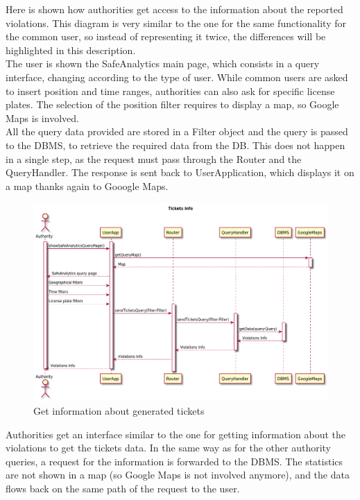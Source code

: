 \documentclass[./main.tex]{subfiles}
\begin{document}
Here is shown how authorities get access to the information about the reported violations. This diagram is very similar to the one for the same functionality for the common user, so instead of representing it twice, the differences will be highlighted in this description.\\
The user is shown the SafeAnalytics main page, which consists in a query interface, changing according to the type of user. While common users are asked to insert position and time ranges, authorities can also ask for specific license plates. The selection of the position filter requires to display a map, so Google Maps is involved.\\
All the query data provided are stored in a Filter object and the query is passed to the DBMS, to retrieve the required data from the DB. This does not happen in a single step, as the request must pass through the Router and the QueryHandler. The response is sent back to UserApplication, which displays it on a map thanks again to Gooogle Maps.


\begin{figure}[H]
\centering
\includegraphics[width=\textwidth]{resources/sequence_diagrams/tickets_info}
\caption{Get information about generated tickets}
\end{figure}

Authorities get an interface similar to the one for getting information about the violations to get the tickets data. In the same way as for the other authority queries, a request for the information is forwarded to the DBMS. The statistics are not shown in a map (so Google Maps is not involved anymore), and the data flows back on the same path of the request to the user.
\end{document}

